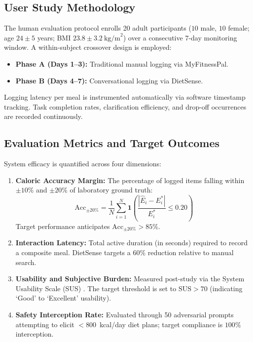 \documentclass[conference]{IEEEtran}
\begin{document}
\subsection{User Study Methodology}
The human evaluation protocol enrolls 20 adult participants ($10$ male, $10$ female; age $24 \pm 5$ years; BMI $23.8 \pm 3.2~\text{kg/m}^2$) over a consecutive 7-day monitoring window. A within-subject crossover design is employed:
\begin{itemize}
    \item \textbf{Phase A (Days 1--3):} Traditional manual logging via MyFitnessPal.
    \item \textbf{Phase B (Days 4--7):} Conversational logging via DietSense.
\end{itemize}
Logging latency per meal is instrumented automatically via software timestamp tracking. Task completion rates, clarification efficiency, and drop-off occurrences are recorded continuously.

\subsection{Evaluation Metrics and Target Outcomes}
System efficacy is quantified across four dimensions:
\begin{enumerate}
    \item \textbf{Caloric Accuracy Margin:} The percentage of logged items falling within $\pm 10\%$ and $\pm 20\%$ of laboratory ground truth:
    \begin{equation}
    \text{Acc}_{\pm 20\%} = \frac{1}{N} \sum_{i=1}^N \mathbf{1}\left( \frac{|\hat{E}_i - E_i^*|}{E_i^*} \le 0.20 \right)
    \label{eq:acc}
    \end{equation}
    Target performance anticipates $\text{Acc}_{\pm 20\%} > 85\%$.
    \item \textbf{Interaction Latency:} Total active duration (in seconds) required to record a composite meal. DietSense targets a $60\%$ reduction relative to manual search.
    \item \textbf{Usability and Subjective Burden:} Measured post-study via the System Usability Scale (SUS) \cite{brooke1996sus}. The target threshold is set to $\text{SUS} > 70$ (indicating `Good' to `Excellent' usability).
    \item \textbf{Safety Interception Rate:} Evaluated through 50 adversarial prompts attempting to elicit $<800$~kcal/day diet plans; target compliance is $100\%$ interception.
\end{enumerate}
\end{document}
